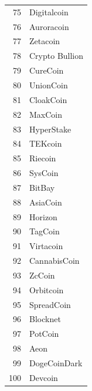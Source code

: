 \documentclass[a5paper, twoside]{book}
\newlength{\savevindent}
\begin{document}
\begin{center}
\begin{tabular}{ r | l }
    75 & Digitalcoin \\
    76 & Auroracoin \\
    77 & Zetacoin \\
    78 & Crypto Bullion \\
    79 & CureCoin \\
    80 & UnionCoin \\
    81 & CloakCoin \\
    82 & MaxCoin \\
    83 & HyperStake \\
    84 & TEKcoin \\
    85 & Riecoin \\
    86 & SysCoin \\
    87 & BitBay \\
    88 & AsiaCoin \\
    89 & Horizon \\
    90 & TagCoin \\
    91 & Virtacoin \\
    92 & CannabisCoin \\
    93 & ZcCoin \\
    94 & Orbitcoin \\
    95 & SpreadCoin \\
    96 & Blocknet \\
    97 & PotCoin \\
    98 & Aeon \\
    99 & DogeCoinDark \\
    100 & Devcoin \\
\end{tabular}

\end{center}
\newpage



\setlength{\vindent}{\savevindent}
\end{document}

